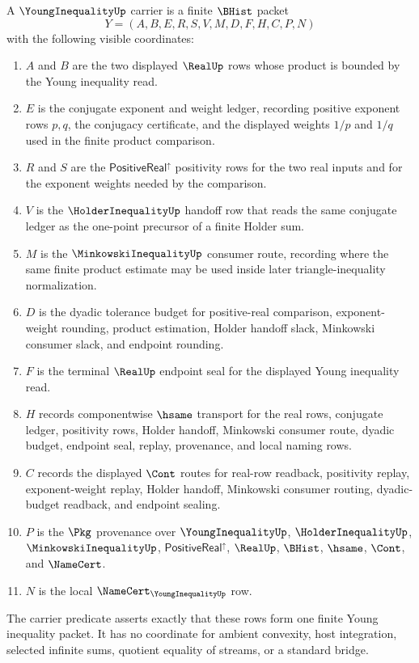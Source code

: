 \begin{definition}\label{def:young-inequality-carrier}
A $\YoungInequalityUp$ carrier is a finite $\BHist$ packet
$$
Y=(A,B,E,R,S,V,M,D,F,H,C,P,N)
$$
with the following visible coordinates:
\begin{enumerate}
\item $A$ and $B$ are the two displayed $\RealUp$ rows whose product is bounded by the Young inequality read.
\item $E$ is the conjugate exponent and weight ledger, recording positive exponent rows $p,q$, the conjugacy certificate, and the displayed weights $1/p$ and $1/q$ used in the finite product comparison.
\item $R$ and $S$ are the $\mathsf{PositiveReal}^{\uparrow}$ positivity rows for the two real inputs and for the exponent weights needed by the comparison.
\item $V$ is the $\HolderInequalityUp$ handoff row that reads the same conjugate ledger as the one-point precursor of a finite Holder sum.
\item $M$ is the $\MinkowskiInequalityUp$ consumer route, recording where the same finite product estimate may be used inside later triangle-inequality normalization.
\item $D$ is the dyadic tolerance budget for positive-real comparison, exponent-weight rounding, product estimation, Holder handoff slack, Minkowski consumer slack, and endpoint rounding.
\item $F$ is the terminal $\RealUp$ endpoint seal for the displayed Young inequality read.
\item $H$ records componentwise $\hsame$ transport for the real rows, conjugate ledger, positivity rows, Holder handoff, Minkowski consumer route, dyadic budget, endpoint seal, replay, provenance, and local naming rows.
\item $C$ records the displayed $\Cont$ routes for real-row readback, positivity replay, exponent-weight replay, Holder handoff, Minkowski consumer routing, dyadic-budget readback, and endpoint sealing.
\item $P$ is the $\Pkg$ provenance over $\YoungInequalityUp$, $\HolderInequalityUp$, $\MinkowskiInequalityUp$, $\mathsf{PositiveReal}^{\uparrow}$, $\RealUp$, $\BHist$, $\hsame$, $\Cont$, and $\NameCert$.
\item $N$ is the local $\NameCert_{\YoungInequalityUp}$ row.
\end{enumerate}
The carrier predicate asserts exactly that these rows form one finite Young inequality packet. It has no coordinate for ambient convexity, host integration, selected infinite sums, quotient equality of streams, or a standard bridge.
\end{definition}

